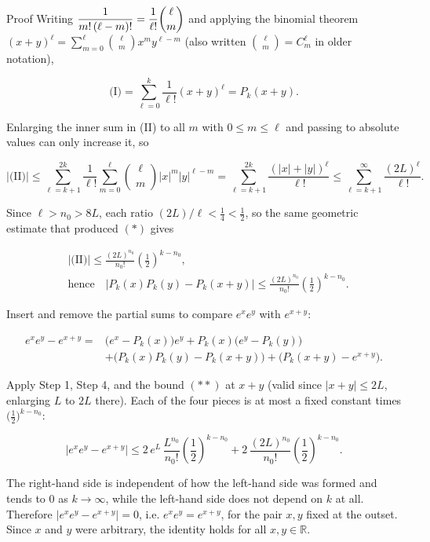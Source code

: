 \documentclass[a4paper,12pt,oneside]{memoir}
\begin{document}
\begin{envproof}{Proof}{}{}
Writing \(\dfrac{1}{m!\,(\ell - m)!} = \dfrac{1}{\ell!}\dbinom{\ell}{m}\) and applying the binomial theorem \((x + y)^{\ell} = \sum_{m=0}^{\ell} \binom{\ell}{m} x^{m} y^{\ell - m}\) (also written \(\binom{\ell}{m} = C^{\ell}_{m}\) in older notation),

\[ \text{(I)} = \sum_{\ell = 0}^{k} \frac{1}{\ell!} (x + y)^{\ell} = P_{k}(x + y). \]

Enlarging the inner sum in (II) to all \(m\) with \(0 \le m \le \ell\) and passing to absolute values can only increase it, so

\[ \lvert \text{(II)} \rvert \le \sum_{\ell = k + 1}^{2k} \frac{1}{\ell!} \sum_{m = 0}^{\ell} \binom{\ell}{m} \lvert x \rvert^{m} \lvert y \rvert^{\ell - m} = \sum_{\ell = k + 1}^{2k} \frac{(\lvert x \rvert + \lvert y \rvert)^{\ell}}{\ell!} \le \sum_{\ell = k + 1}^{\infty} \frac{(2L)^{\ell}}{\ell!}. \]

Since \(\ell > n_{0} > 8L\), each ratio \((2L)/\ell < \tfrac{1}{4} < \tfrac{1}{2}\), so the same geometric estimate that produced \((*)\) gives

\[ \begin{aligned}
        &\lvert \text{(II)} \rvert \le \frac{(2L)^{n_{0}}}{n_{0}!} \left(\frac{1}{2}\right)^{k - n_{0}}, \\[2pt]
        &\text{hence}\quad \bigl\lvert P_{k}(x) P_{k}(y) - P_{k}(x + y) \bigr\rvert \le \frac{(2L)^{n_{0}}}{n_{0}!} \left(\frac{1}{2}\right)^{k - n_{0}}.
      \end{aligned} \]

Insert and remove the partial sums to compare \(e^{x} e^{y}\) with \(e^{x + y}\):

\[ \begin{aligned} e^{x} e^{y} - e^{x + y} = {}&\bigl(e^{x} - P_{k}(x)\bigr) e^{y} + P_{k}(x)\bigl(e^{y} - P_{k}(y)\bigr) \\ &+ \bigl(P_{k}(x) P_{k}(y) - P_{k}(x + y)\bigr) + \bigl(P_{k}(x + y) - e^{x + y}\bigr). \end{aligned} \]

Apply Step 1, Step 4, and the bound \((**)\) at \(x + y\) (valid since \(\lvert x + y \rvert \le 2L\), enlarging \(L\) to \(2L\) there). Each of the four pieces is at most a fixed constant times \(\bigl(\tfrac{1}{2}\bigr)^{k - n_{0}}\):

\[ \lvert e^{x} e^{y} - e^{x + y} \rvert \le 2\, e^{L}\, \frac{L^{n_{0}}}{n_{0}!} \left(\frac{1}{2}\right)^{k - n_{0}} + 2\, \frac{(2L)^{n_{0}}}{n_{0}!} \left(\frac{1}{2}\right)^{k - n_{0}}. \]

The right-hand side is independent of how the left-hand side was formed and tends to \(0\) as \(k \to \infty\), while the left-hand side does not depend on \(k\) at all. Therefore \(\lvert e^{x} e^{y} - e^{x + y} \rvert = 0\), i.e. \(e^{x} e^{y} = e^{x + y}\), for the pair \(x, y\) fixed at the outset. Since \(x\) and \(y\) were arbitrary, the identity holds for all \(x, y \in \mathbb{R}\). \qedmark
\end{envproof}
\end{document}
